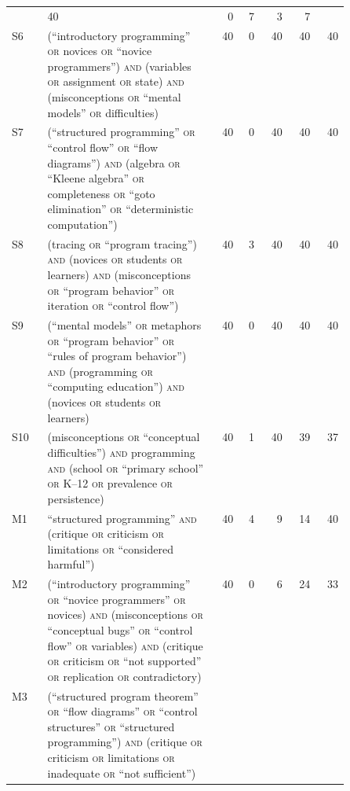 \begin{table}[htbp]
\begin{sidecaption}
\begin{tabular}{@{}lp{0.5\linewidth}rrrrr@{}}
         & 40 & 0 & 7 & 3 & 7 \\
      S6 & (\enquote{introductory programming} \textsc{or} novices \textsc{or} \enquote{novice programmers}) \textsc{and} (variables \textsc{or} assignment \textsc{or} state) \textsc{and} (misconceptions \textsc{or} \enquote{mental models} \textsc{or} difficulties)
         & 40 & 0 & 40 & 40 & 40 \\
      S7 & (\enquote{structured programming} \textsc{or} \enquote{control flow} \textsc{or} \enquote{flow diagrams}) \textsc{and} (algebra \textsc{or} \enquote{Kleene algebra} \textsc{or} completeness \textsc{or} \enquote{goto elimination} \textsc{or} \enquote{deterministic computation})
         & 40 & 0 & 40 & 40 & 40 \\
      S8 & (tracing \textsc{or} \enquote{program tracing}) \textsc{and} (novices \textsc{or} students \textsc{or} learners) \textsc{and} (misconceptions \textsc{or} \enquote{program behavior} \textsc{or} iteration \textsc{or} \enquote{control flow})
         & 40 & 3 & 40 & 40 & 40 \\
      S9 & (\enquote{mental models} \textsc{or} metaphors \textsc{or} \enquote{program behavior} \textsc{or} \enquote{rules of program behavior}) \textsc{and} (programming \textsc{or} \enquote{computing education}) \textsc{and} (novices \textsc{or} students \textsc{or} learners)
         & 40 & 0 & 40 & 40 & 40 \\
      S10 & (misconceptions \textsc{or} \enquote{conceptual difficulties}) \textsc{and} programming \textsc{and} (school \textsc{or} \enquote{primary school} \textsc{or} K--12 \textsc{or} prevalence \textsc{or} persistence)
         & 40 & 1 & 40 & 39 & 37 \\
      \midrule
      M1 & \enquote{structured programming} \textsc{and} (critique \textsc{or} criticism \textsc{or} limitations \textsc{or} \enquote{considered harmful})
         & 40 & 4 & 9 & 14 & 40 \\
      M2 & (\enquote{introductory programming} \textsc{or} \enquote{novice programmers} \textsc{or} novices) \textsc{and} (misconceptions \textsc{or} \enquote{conceptual bugs} \textsc{or} \enquote{control flow} \textsc{or} variables) \textsc{and} (critique \textsc{or} criticism \textsc{or} \enquote{not supported} \textsc{or} replication \textsc{or} contradictory)
         & 40 & 0 & 6 & 24 & 33 \\
      M3 & (\enquote{structured program theorem} \textsc{or} \enquote{flow diagrams} \textsc{or} \enquote{control structures} \textsc{or} \enquote{structured programming}) \textsc{and} (critique \textsc{or} criticism \textsc{or} limitations \textsc{or} inadequate \textsc{or} \enquote{not sufficient})

\end{tabular}
\end{sidecaption}
\end{table}
